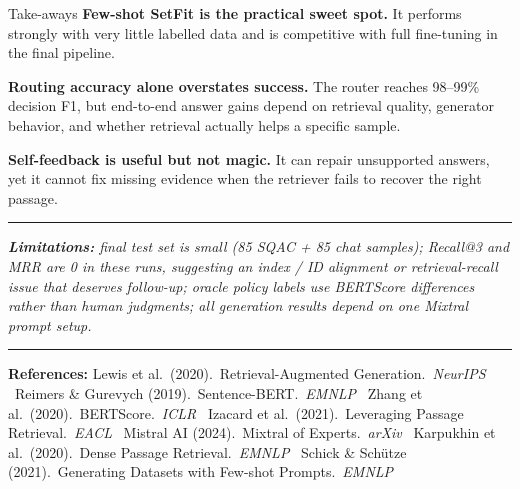 \documentclass[final]{beamer}
\begin{document}
\begin{frame}[t]
\begin{alertblock}{Take-aways}
\vspace{0.45em}
\textbf{\color{primarypurple}Few-shot SetFit is the practical sweet spot.}
It performs strongly with very little labelled data and is competitive with
full fine-tuning in the final pipeline.

\vspace{0.45em}
\textbf{\color{accentorange}Routing accuracy alone overstates success.}
The router reaches 98--99\% decision F1, but end-to-end answer gains depend on
retrieval quality, generator behavior, and whether retrieval actually helps a
specific sample.

\vspace{0.45em}
\textbf{\color{successgreen}Self-feedback is useful but not magic.}
It can repair unsupported answers, yet it cannot fix missing evidence when the
retriever fails to recover the right passage.
\end{alertblock}

\vspace{0.7em}
\hrule
\vspace{0.5em}
{\small\itshape \textbf{Limitations:} final test set is small (85 SQAC + 85 chat samples); Recall@3 and MRR are 0 in these runs, suggesting an index / ID alignment or retrieval-recall issue that deserves follow-up; oracle policy labels use BERTScore differences rather than human judgments; all generation results depend on one Mixtral prompt setup.}

\vspace{0.5em}
\hrule\vspace{0.4em}
\footnotesize\textbf{References:}\quad
Lewis et al.\ (2020).\ Retrieval-Augmented Generation.\ \emph{NeurIPS} \textbullet\
Reimers \& Gurevych (2019).\ Sentence-BERT.\ \emph{EMNLP} \textbullet\
Zhang et al.\ (2020).\ BERTScore.\ \emph{ICLR} \textbullet\
Izacard et al.\ (2021).\ Leveraging Passage Retrieval.\ \emph{EACL} \textbullet\
Mistral AI (2024).\ Mixtral of Experts.\ \emph{arXiv} \textbullet\
Karpukhin et al.\ (2020).\ Dense Passage Retrieval.\ \emph{EMNLP} \textbullet\
Schick \& Schütze (2021).\ Generating Datasets with Few-shot Prompts.\ \emph{EMNLP}

\end{frame}
\end{document}
